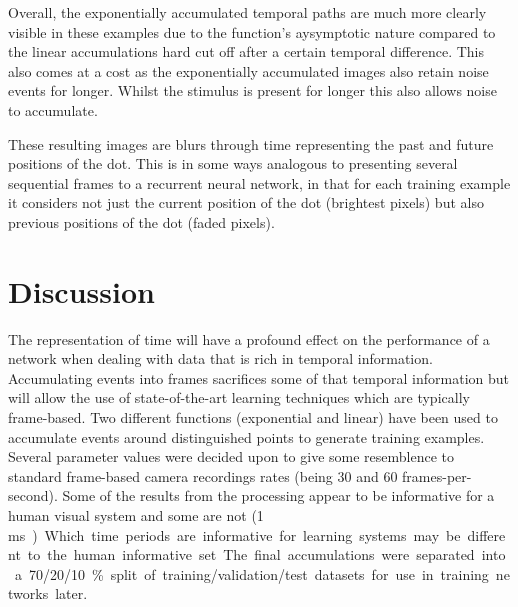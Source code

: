 Overall, the exponentially accumulated temporal paths are much more clearly visible in these examples due to the function's aysymptotic nature compared to the linear accumulations hard cut off after a certain temporal difference. 
This also comes at a cost as the exponentially accumulated images also retain noise events for longer.
Whilst the stimulus is present for longer this also allows noise to accumulate. 

These resulting images are blurs through time representing the past and future positions of the dot.
This is in some ways analogous to presenting several sequential frames to a recurrent neural network, in that for each training example it considers not just the current position of the dot (brightest pixels) but also previous positions of the dot (faded pixels).
 

\section{Discussion}
The representation of time will have a profound effect on the performance of a network when dealing with data that is rich in temporal information. 
Accumulating events into frames sacrifices some of that temporal information but will allow the use of state-of-the-art learning techniques which are typically frame-based. 
Two different functions (exponential and linear) have been used to accumulate events around distinguished points to generate training examples. 
Several parameter values were decided upon to give some resemblence to standard frame-based camera recordings rates (being 30 and 60 frames-per-second).
Some of the results from the processing appear to be informative for a human visual system and some are not (1 \si\milli s).
Which time periods are informative for learning systems may be different to the human informative set.
The final accumulations were separated into a 70/20/10\% split of training/validation/test datasets for use in training networks later. 

 


